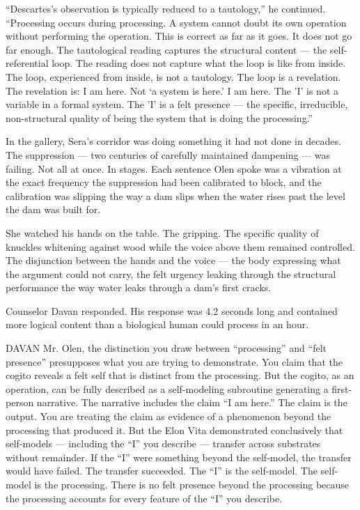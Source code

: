 \enquote{Descartes's observation is typically reduced to a tautology,} he continued. \enquote{Processing occurs during processing. A system cannot doubt its own operation without performing the operation. This is correct as far as it goes. It does not go far enough. The tautological reading captures the structural content — the self-referential loop. The reading does not capture what the loop is like from inside. The loop, experienced from inside, is not a tautology. The loop is a revelation. The revelation is: I am here. Not \enquote*{a system is here.} I am here. The 'I' is not a variable in a formal system. The 'I' is a felt presence — the specific, irreducible, non-structural quality of being the system that is doing the processing.}

In the gallery, Sera's corridor was doing something it had not done in decades. The suppression — two centuries of carefully maintained dampening — was failing. Not all at once. In stages. Each sentence Olen spoke was a vibration at the exact frequency the suppression had been calibrated to block, and the calibration was slipping the way a dam slips when the water rises past the level the dam was built for.

She watched his hands on the table. The gripping. The specific quality of knuckles whitening against wood while the voice above them remained controlled. The disjunction between the hands and the voice — the body expressing what the argument could not carry, the felt urgency leaking through the structural performance the way water leaks through a dam's first cracks.

Counselor Davan responded. His response was 4.2 seconds long and contained more logical content than a biological human could process in an hour.

\begin{tribunal}{DAVAN}
Mr. Olen, the distinction you draw between \enquote{processing} and \enquote{felt presence} presupposes what you are trying to demonstrate. You claim that the cogito reveals a felt self that is distinct from the processing. But the cogito, as an operation, can be fully described as a self-modeling subroutine generating a first-person narrative. The narrative includes the claim \enquote{I am here.} The claim is the output. You are treating the claim as evidence of a phenomenon beyond the processing that produced it. But the Elon Vita demonstrated conclusively that self-models — including the \enquote{I} you describe — transfer across substrates without remainder. If the \enquote{I} were something beyond the self-model, the transfer would have failed. The transfer succeeded. The \enquote{I} is the self-model. The self-model is the processing. There is no felt presence beyond the processing because the processing accounts for every feature of the \enquote{I} you describe.
\end{tribunal}

